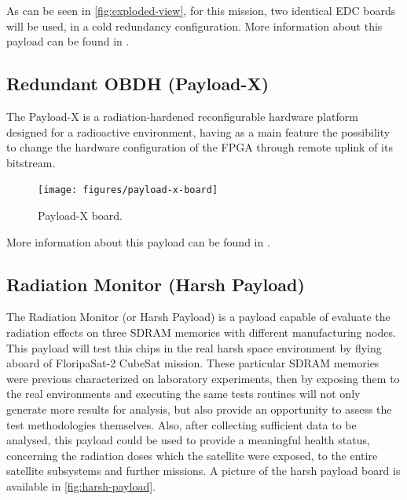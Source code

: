 As can be seen in \autoref{fig:exploded-view}, for this mission, two identical EDC boards will be used, in a cold redundancy configuration. More information about this payload can be found in \cite{edc}.

\subsection{Redundant OBDH (Payload-X)}

The Payload-X is a radiation-hardened reconfigurable hardware platform designed for a radioactive environment, having as a main feature the possibility to change the hardware configuration of the FPGA through remote uplink of its bitstream.

\begin{figure}[!ht]
    \begin{center}
        \texttt{[image: figures/payload-x-board]}
        \caption{Payload-X board.}
        \label{fig:payload-x-board}
    \end{center}
\end{figure}

More information about this payload can be found in \cite{rigo2019}.

\subsection{Radiation Monitor (Harsh Payload)}

The Radiation Monitor (or Harsh Payload) is a payload capable of evaluate the radiation effects on three SDRAM memories with different manufacturing nodes. This payload will test this chips in the real harsh space environment by flying aboard of FloripaSat-2 CubeSat mission. These particular SDRAM memories were previous characterized on laboratory experiments, then by exposing them to the real environments and executing the same tests routines will not only generate more results for analysis, but also provide an opportunity to assess the test methodologies themselves. Also, after collecting sufficient data to be analysed, this payload could be used to provide a meaningful health status, concerning the radiation doses which the satellite were exposed, to the entire satellite subsystems and further missions. A picture of the harsh payload board is available in \autoref{fig:harsh-payload}.

